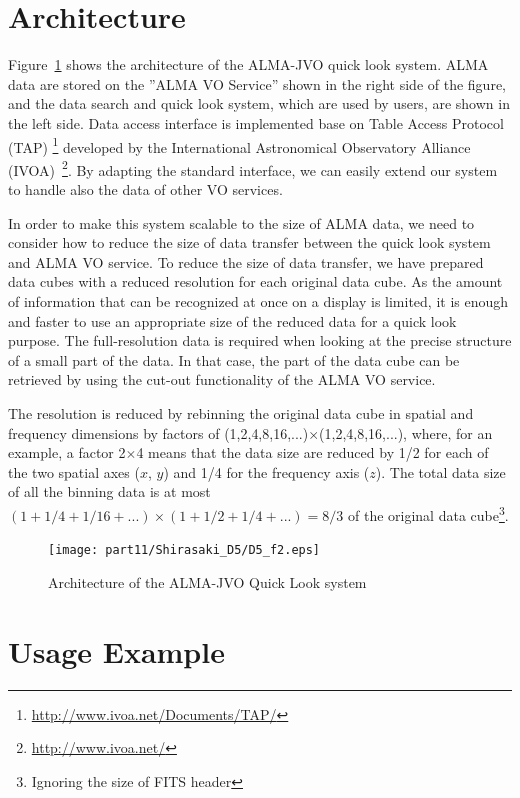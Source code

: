 \section{Architecture}

Figure~\ref{fig:2} shows the architecture of the ALMA-JVO quick look system.
ALMA data are stored on the ''ALMA VO Service'' shown in the right side of 
the figure, and the data search and quick look system, which are used by 
users, are shown in the left side.
Data access interface is implemented base on Table Access Protocol (TAP)
\footnote{\url{http://www.ivoa.net/Documents/TAP/}}
developed by the International Astronomical Observatory Alliance 
(IVOA)~\footnote{\url{http://www.ivoa.net/}}.
By adapting the standard interface, we can easily extend our system to
handle also the data of other VO services.

In order to make this system scalable to the size of ALMA data, we need to
consider how to reduce the size of data transfer between the quick look system
and ALMA VO service.
To reduce the size of data transfer, we have prepared data cubes with a reduced
resolution for each original data cube.
As the amount of information that can be recognized at once on a display 
is limited, it is enough and faster to use an appropriate size of the 
reduced data for a quick look purpose.
The full-resolution data is required when looking at the precise structure
of a small part of the data.
In that case, the part of the data cube can be retrieved by using the
cut-out functionality of the ALMA VO service.

The resolution is reduced by rebinning the original data cube in spatial and
frequency dimensions by factors of (1,2,4,8,16,...)$\times$(1,2,4,8,16,...),
where, for an example, a factor 2$\times$4 means that the data size are 
reduced by 1/2 for each of the two spatial axes ($x$, $y$) and 1/4 for the 
frequency axis ($z$).
The total data size of all the binning data is at most 
$(1 + 1/4 + 1/16 + ...) \times (1 + 1/2 + 1/4 + ...) = 8/3$  of the original data
cube\footnote{Ignoring the size of FITS header}.


\begin{figure}[t]
\begin{center}
\texttt{[image: part11/Shirasaki\_D5/D5\_f2.eps]}
\caption{Architecture of the ALMA-JVO Quick Look system}
\label{fig:2}
\end{center}
\end{figure}

\section{Usage Example}

